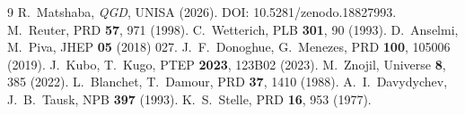 \documentclass[11pt,a4paper]{article}
\theoremstyle{plain}
\theoremstyle{definition}
\theoremstyle{remark}
\begin{document}
\begin{thebibliography}{9}
R.~Matshaba, \textit{QGD}, UNISA (2026). DOI: 10.5281/zenodo.18827993.
M.~Reuter, PRD \textbf{57}, 971 (1998).
C.~Wetterich, PLB \textbf{301}, 90 (1993).
D.~Anselmi, M.~Piva, JHEP \textbf{05} (2018) 027.
J.~F.~Donoghue, G.~Menezes, PRD \textbf{100}, 105006 (2019).
J.~Kubo, T.~Kugo, PTEP \textbf{2023}, 123B02 (2023).
M.~Znojil, Universe \textbf{8}, 385 (2022).
L.~Blanchet, T.~Damour, PRD \textbf{37}, 1410 (1988).
A.~I.~Davydychev, J.~B.~Tausk, NPB \textbf{397} (1993).
K.~S.~Stelle, PRD \textbf{16}, 953 (1977).
\end{thebibliography}
\end{document}
